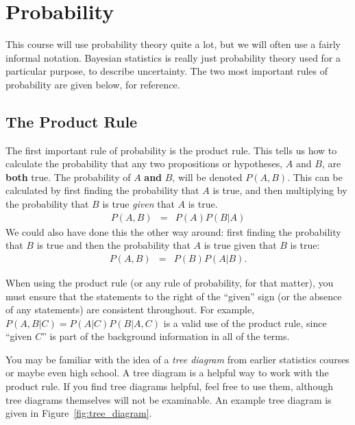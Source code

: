 \chapter{Probability}\label{sec:probability}
This course will use probability theory quite a lot, but we will often use
a fairly informal notation. Bayesian
statistics is really just probability theory used for a particular purpose,
to describe uncertainty. The two most important rules of probability are given below,
for reference.

\section{The Product Rule}
The first important rule of probability is the
product rule. This tells us how to calculate the probability that any two
propositions or hypotheses, $A$ and $B$, are {\bf both} true.
The probability of $A$ {\bf and}
$B$, will be denoted $P(A, B)$. This can be calculated by first finding the
probability that $A$ is true, and then multiplying by the probability that $B$
is true {\it given} that $A$ is true.
\begin{eqnarray}
P(A, B) &=& P(A)P(B|A)\label{product1}
\end{eqnarray}
We could also have done this the other way around: first finding the
probability that $B$ is true and then the probability that $A$ is true given
that $B$ is true:
\begin{eqnarray}
P(A, B) &=& P(B)P(A|B).\label{product2}
\end{eqnarray}

When using the product rule (or any rule of probability, for that matter), you
must ensure that the statements to the right of the ``given'' sign (or the
absence of any statements) are consistent throughout. For example,
$P(A, B|C) = P(A|C)P(B|A, C)$ is a valid use of the product rule, since
``given $C$'' is part of the background information in all of the terms.

You may be familiar with the idea of a {\it tree diagram} from earlier
statistics courses or maybe even high school. A tree diagram is a helpful way
to work with the product rule. If you find tree diagrams helpful, feel free to
use them, although tree diagrams themselves will not be examinable.
An example tree diagram is given in Figure~\ref{fig:tree_diagram}.

